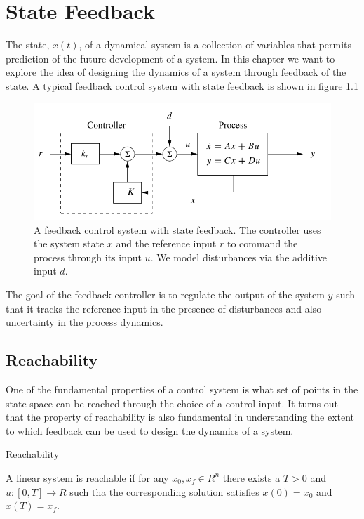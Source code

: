 \chapter{State Feedback}
\label{state_feedback}

The state, $x(t)$, of a dynamical system is a collection of variables that permits prediction
of the future development of a system. In this chapter we want to  explore the idea of designing
the dynamics of a system through feedback of the state.  A typical feedback control system with state feedback
is shown in figure \ref{state_feedback_sys}

\begin{figure}[!htb]
\begin{center}
\includegraphics[scale=0.280]{img/state_feedback/state_feedback_sys.jpeg}
\end{center}
\caption{A feedback control system with state feedback. The controller uses the system
state $x$ and the reference input $r$ to command the process through its input $u$. We model
disturbances via the additive input $d$.}
\label{state_feedback_sys}
\end{figure}


The goal of the feedback controller is to regulate the output of the system $y$ such that it tracks the reference input in the presence of disturbances and also uncertainty in the process dynamics.

\section{Reachability}
One of the fundamental properties of a control system is what set of points in the
state space can be reached through the choice of a control input. It turns out that the
property of reachability is also fundamental in understanding the extent to which
feedback can be used to design the dynamics of a system.


\begin{framed}

\theoremstyle{definition}
\begin{definition}{Reachability}

A linear system is reachable if for any $x_0, x_f \in R^n$ there exists a $T > 0$ and $u: [0,T] \rightarrow R$ such tha the corresponding solution satisfies $x(0) = x_0$ and $x(T) = x_f$.
\end{definition}

\end{framed}


